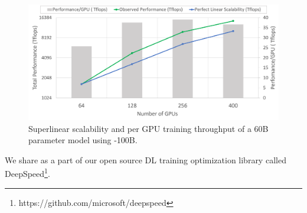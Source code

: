 \begin{figure}[t!]
 \begin{center}
 \includegraphics[width=1.0\columnwidth]{hyperscale_60B_model_v2.PNG}
 \caption{Superlinear scalability and per GPU training throughput of a 60B parameter model using \name-100B.} 
 \label{fig:hyperscale_60B}
 \end{center}
 \end{figure}

We share \name as a part of our open source DL training optimization library called DeepSpeed\footnote{https://github.com/microsoft/deepspeed}.